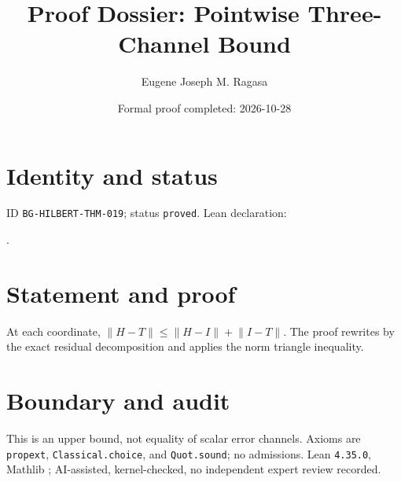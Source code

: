 \documentclass[11pt]{article}
\title{Proof Dossier: Pointwise Three-Channel Bound}\author{Eugene Joseph M. Ragasa}\date{Formal proof completed: 2026-10-28}
\begin{document}
\raggedright\maketitle
\section{Identity and status}
ID \texttt{BG-HILBERT-THM-019}; status \texttt{proved}. Lean declaration:
\par{}.
\section{Statement and proof}
At each coordinate, $\lVert H-T\rVert\leq\lVert H-I\rVert+\lVert I-T\rVert$. The proof rewrites by the exact residual decomposition and applies the norm triangle inequality.
\section{Boundary and audit}
This is an upper bound, not equality of scalar error channels. Axioms are \texttt{propext}, \texttt{Classical.choice}, and \texttt{Quot.sound}; no admissions. Lean \texttt{4.35.0}, Mathlib {\scriptsize{}}; AI-assisted, kernel-checked, no independent expert review recorded.
\end{document}
